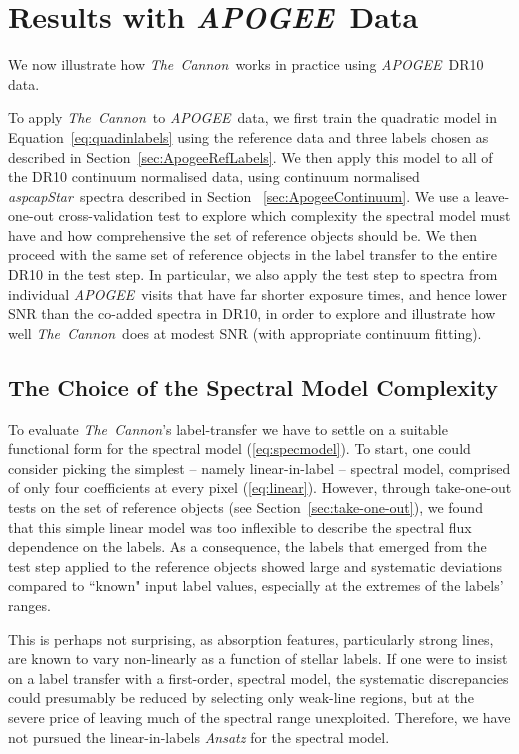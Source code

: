 \documentclass[12pt, preprint]{aastex}
\newcommand{\sectionname}{Section}
\newcommand{\tc}{\textsl{The~Cannon}}
\newcommand{\apogee}{\textsl{APOGEE}}
\newcommand{\aspcapstar}{\textsl{aspcapStar}}
\begin{document}
\section{Results with \apogee\ Data}
\label{sec:results}


We now illustrate how \tc\ works in practice using \apogee\ DR10 data.  

To apply \tc\ to \apogee\ data, we first train the quadratic model in Equation~\ref{eq:quadinlabels} using the reference data and three labels chosen as described in Section~\ref{sec:ApogeeRefLabels}. We then apply this model to all of the DR10 continuum normalised data, using continuum normalised \aspcapstar\ spectra described in Section~ \ref{sec:ApogeeContinuum}. We use a leave-one-out cross-validation test to explore which complexity the spectral model must have and how comprehensive the set of reference objects should be. We then proceed with the same set of reference objects in the label transfer to the entire DR10 in the test step. In particular, we also apply the test step to spectra from individual \apogee\ visits that have far shorter exposure times, and hence lower SNR than the co-added spectra in DR10, in order to explore and illustrate how well \tc\ does at modest SNR (with appropriate continuum fitting).


\subsection{The Choice of the Spectral Model Complexity}
\label{sec:ModelComplexity} 

To evaluate \tc 's label-transfer we have to settle on a suitable functional form for the spectral model (\ref{eq:specmodel}).
To start, one could consider picking the simplest -- namely linear-in-label -- spectral model, comprised of only four coefficients at every pixel (\ref{eq:linear}).
However, through take-one-out tests on the set of reference objects (see \sectionname~\ref{sec:take-one-out}), we found that this simple linear model was too inflexible to describe the spectral flux dependence on the labels.
As a consequence, the labels that emerged from the test step applied to the reference objects showed large and systematic deviations compared to ``known" input label values,
especially at the extremes of the labels' ranges. 

This is perhaps not surprising, as absorption features, particularly strong lines, are known to vary non-linearly as a function of stellar labels. If one were to insist on a label transfer with a first-order, spectral model, the systematic discrepancies could presumably be reduced by selecting only weak-line regions, but at the severe price of leaving much of the spectral range unexploited. Therefore, we have not pursued the linear-in-labels \textit{Ansatz} for the spectral model.
\end{document}
